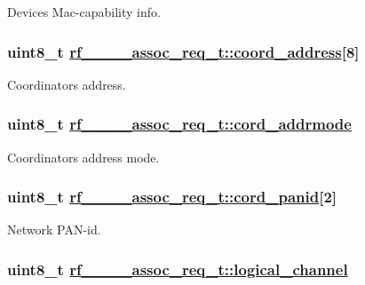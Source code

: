 Devices Mac-capability info. \hypertarget{structrf__802__15__4__assoc__req__t_294ed6e2e6aa5baa4908f39f3dd26b9f}{
\subsubsection[coord\_\-address]{\setlength{\rightskip}{0pt plus 5cm}uint8\_\-t \hyperlink{structrf__802__15__4__assoc__req__t_294ed6e2e6aa5baa4908f39f3dd26b9f}{rf\_\_\_\_\-assoc\_\-req\_\-t::coord\_\-address}\mbox{[}8\mbox{]}}}
\label{structrf__802__15__4__assoc__req__t_294ed6e2e6aa5baa4908f39f3dd26b9f}


Coordinators address. \hypertarget{structrf__802__15__4__assoc__req__t_cfc3ef092d3cccf0b16fccfabfd73254}{
\subsubsection[cord\_\-addrmode]{\setlength{\rightskip}{0pt plus 5cm}uint8\_\-t \hyperlink{structrf__802__15__4__assoc__req__t_cfc3ef092d3cccf0b16fccfabfd73254}{rf\_\_\_\_\-assoc\_\-req\_\-t::cord\_\-addrmode}}}
\label{structrf__802__15__4__assoc__req__t_cfc3ef092d3cccf0b16fccfabfd73254}


Coordinators address mode. \hypertarget{structrf__802__15__4__assoc__req__t_6ef014ac1fe8af11db0b0b73d8e6de99}{
\subsubsection[cord\_\-panid]{\setlength{\rightskip}{0pt plus 5cm}uint8\_\-t \hyperlink{structrf__802__15__4__assoc__req__t_6ef014ac1fe8af11db0b0b73d8e6de99}{rf\_\_\_\_\-assoc\_\-req\_\-t::cord\_\-panid}\mbox{[}2\mbox{]}}}
\label{structrf__802__15__4__assoc__req__t_6ef014ac1fe8af11db0b0b73d8e6de99}


Network PAN-id. \hypertarget{structrf__802__15__4__assoc__req__t_fcfe7e9969125cb656aaf65778e130a7}{
\subsubsection[logical\_\-channel]{\setlength{\rightskip}{0pt plus 5cm}uint8\_\-t \hyperlink{structrf__802__15__4__assoc__req__t_fcfe7e9969125cb656aaf65778e130a7}{rf\_\_\_\_\-assoc\_\-req\_\-t::logical\_\-channel}}}
\label{structrf__802__15__4__assoc__req__t_fcfe7e9969125cb656aaf65778e130a7}


